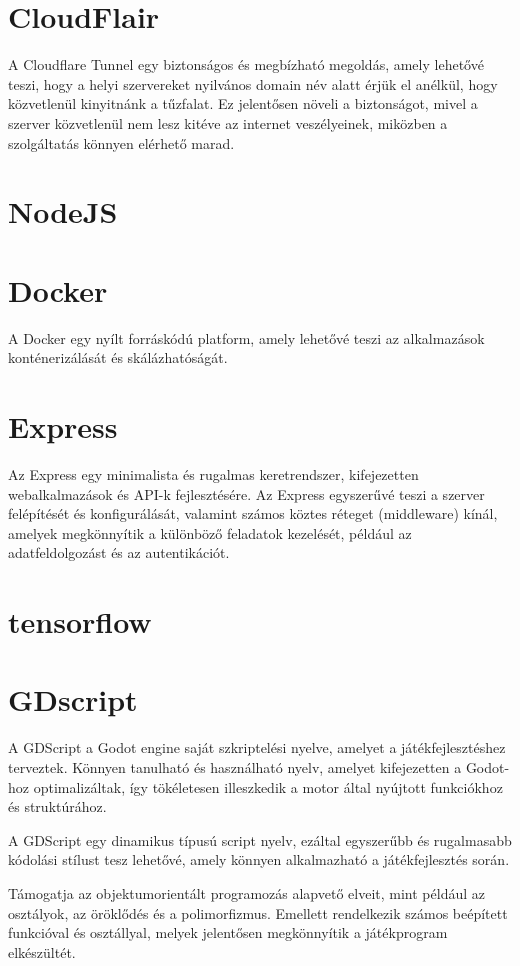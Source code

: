 \section{CloudFlair}
A Cloudflare Tunnel egy biztonságos és megbízható megoldás, amely lehetővé teszi, hogy a helyi szervereket nyilvános domain név alatt érjük el anélkül, hogy közvetlenül kinyitnánk a tűzfalat. Ez jelentősen növeli a biztonságot, mivel a szerver közvetlenül nem lesz kitéve az internet veszélyeinek, miközben a szolgáltatás könnyen elérhető marad.

\section{NodeJS}
\section{Docker}
A Docker egy nyílt forráskódú platform, amely lehetővé teszi az alkalmazások konténerizálását és skálázhatóságát.
\section{Express}
Az Express egy minimalista és rugalmas keretrendszer, kifejezetten webalkalmazások és API-k fejlesztésére. Az Express egyszerűvé teszi a szerver felépítését és konfigurálását, valamint számos köztes réteget (middleware) kínál, amelyek megkönnyítik a különböző feladatok kezelését, például az adatfeldolgozást és az autentikációt.

\section{tensorflow}


\section{GDscript}
A GDScript a Godot engine saját szkriptelési nyelve, amelyet a játékfejlesztéshez terveztek. 
Könnyen tanulható és használható nyelv, amelyet kifejezetten a Godot-hoz optimalizáltak, így tökéletesen illeszkedik a motor által nyújtott funkciókhoz és struktúrához.

A GDScript egy dinamikus típusú script nyelv, ezáltal egyszerűbb és rugalmasabb kódolási stílust tesz lehetővé, amely könnyen alkalmazható a játékfejlesztés során.

Támogatja az objektumorientált programozás alapvető elveit, mint például az osztályok, az öröklődés és a polimorfizmus. Emellett rendelkezik számos beépített funkcióval és osztállyal, melyek jelentősen megkönnyítik a játékprogram elkészültét.
